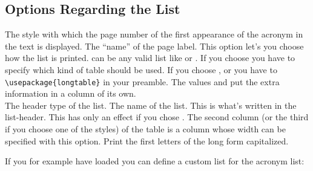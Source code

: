 \documentclass[DIV10,toc=index,toc=bib]{cnpkgdoc}
\begin{document}
\subsection{Options Regarding the List}
\begin{beschreibung}
  The style with which
 the page number of the first appearance of the acronym in the text is displayed.
  The ``name'' of the page label.
  This option let's you
 choose how the list is printed.  can be any valid list like
  or .
  If you choose
  you have to specify which kind of table should be used.
 If you choose ,  or 
 you have to \verb+\usepackage{longtable}+ in your preamble. The values
  and  put the extra information
 in a column of its own.
 \\
 The header type of the list.
  The name of the list. This is
 what's written in the list-header.
  This has only an effect if
 you chose . The second column (or the third if you choose
 one of the  styles) of the table is a  column whose width can
 be specified with this option.
  Print the first letters
 of the long form capitalized.
\end{beschreibung}

If you for example have loaded  you can define a custom list for
the acronym list:
\begin{beispiel}
 \newcommand*\addcolon[1]{#1:}
 \printacronyms
\end{beispiel}
\end{document}

